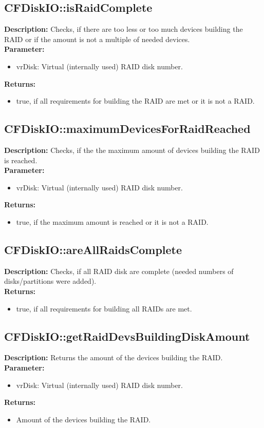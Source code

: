 \subsection{CFDiskIO::isRaidComplete}
\textbf{Description:} Checks, if there are too less or too much devices building the RAID or if the amount is not a multiple of needed devices.\\
\textbf{Parameter:}
\begin{itemize}
\item vrDisk: Virtual (internally used) RAID disk number.
\end{itemize}
\textbf{Returns:}
\begin{itemize}
\item true, if all requirements for building the RAID are met or it is not a RAID.
\end{itemize}

\subsection{CFDiskIO::maximumDevicesForRaidReached}
\textbf{Description:} Checks, if the the maximum amount of devices building the RAID is reached.\\
\textbf{Parameter:}
\begin{itemize}
\item vrDisk: Virtual (internally used) RAID disk number.
\end{itemize}
\textbf{Returns:}
\begin{itemize}
\item true, if the maximum amount is reached or it is not a RAID.
\end{itemize}

\subsection{CFDiskIO::areAllRaidsComplete}
\textbf{Description:} Checks, if all RAID disk are complete (needed numbers of disks/partitions were added).\\
\textbf{Returns:}
\begin{itemize}
\item true, if all requirements for building all RAIDs are met.
\end{itemize}

\subsection{CFDiskIO::getRaidDevsBuildingDiskAmount}
\textbf{Description:} Returns the amount of the devices building the RAID.\\
\textbf{Parameter:}
\begin{itemize}
\item vrDisk: Virtual (internally used) RAID disk number.
\end{itemize}
\textbf{Returns:}
\begin{itemize}
\item Amount of the devices building the RAID.
\end{itemize}

